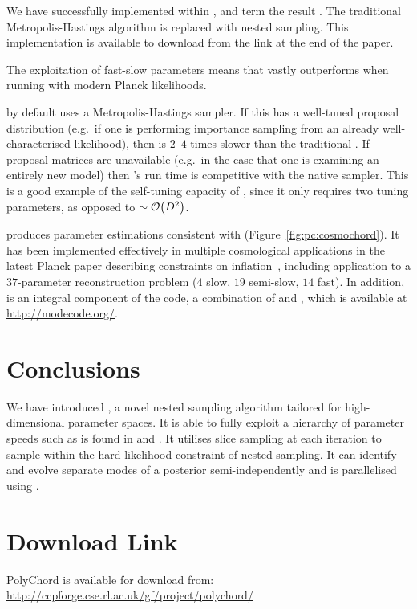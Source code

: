 We have successfully implemented \PolyChord{} within \CosmoMC{}, and term the result \CosmoChord{}.  The traditional Metropolis-Hastings algorithm is replaced with nested sampling. This implementation is available to download from the link at the end of the paper.

The exploitation of fast-slow parameters means that \CosmoChord{} vastly outperforms \MultiNest{} when running with modern Planck likelihoods. 

\CosmoMC{} by default uses a Metropolis-Hastings sampler. If this has a well-tuned proposal distribution (e.g.\ if one is performing importance sampling from an already well-characterised likelihood), then \PolyChord{} is $2$--$4$ times slower than the traditional \CosmoMC{}. If proposal matrices are unavailable (e.g.\ in the case that one is examining an entirely new model) then \CosmoChord{}'s run time is competitive with the native \CosmoMC{} sampler. This is a good example of the self-tuning capacity of \PolyChord{}, since it only requires two tuning parameters, as opposed to ${\sim\mathcal{O}{\left(D^2\right)}}$.

\CosmoChord{} produces parameter estimations consistent with \CosmoMC{} (Figure~\ref{fig:pc:cosmochord}).
It has been implemented effectively in multiple cosmological applications in the latest Planck paper describing constraints on inflation~\citep{planck2015-a24}, including application to a $37$-parameter reconstruction problem ($4$ slow, $19$ semi-slow, $14$ fast). 
In addition, \PolyChord{} is an integral component of the \ModeChord{} code, a combination of \CosmoChord{} and \ModeCode{} \citep{ModeChord1,ModeChord2,ModeChord3}, which is available at \url{http://modecode.org/}.

\section{Conclusions}
\label{sec:pc:conclusions}
We have introduced \PolyChord{}, a novel nested sampling algorithm tailored for high-dimensional parameter spaces. It is able to fully exploit a hierarchy of parameter speeds such as is found in \CosmoMC{} and \CAMB{}. It utilises slice sampling at each iteration to sample within the hard likelihood constraint of nested sampling. It can identify and evolve separate modes of a posterior semi-independently and is parallelised using \openMPI{}.












\section*{Download Link}
PolyChord is available for download from:\\ \url{http://ccpforge.cse.rl.ac.uk/gf/project/polychord/}

\cleardoublepage{}
